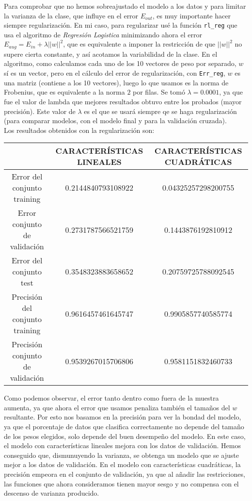 \documentclass{article}
\begin{document}
Para comprobar que no hemos sobreajustado el modelo a los datos y para limitar la varianza de la clase, que influye en el error $E_{out}$, es muy importante hacer siempre regularización. En mi caso, para regularizar usé la función \texttt{rl\_reg} que usa el algoritmo de \textit{Regresión Logistica} minimizando ahora el error $E_{aug} = E_{in} + \lambda ||w||^2$, que es equivalente a imponer la restricción de que $||w||^2$ no supere cierta constante, y así acotamos la variabilidad de la clase. En el algoritmo, como calculamos cada uno de los 10 vectores de peso por separado, $w$ sí es un vector, pero en el cálculo del error de regularización, con \texttt{Err\_reg}, $w$ es una matriz (contiene a los 10 vectores), luego lo que usamos es la norma de Frobenius, que es equivalente a la norma $2$ por filas. Se tomó $\lambda = 0.0001$, ya que fue el valor de lambda que mejores resultados obtuvo entre los probados (mayor precisión). Este valor de $\lambda$ es el que se usará siempre qe se haga regularización (para comparar modelos, con el modelo final y para la validación cruzada).\\

Los resultados obtenidos con la regularización son:

\begin{center}
\begin{tabular}{|c|c|c|}
\hline
\multicolumn{1}{|c|}{}& \textbf{CARACTERÍSTICAS LINEALES} &
\textbf{CARACTERÍSTICAS CUADRÁTICAS}  \\ \hline
  Error del conjunto training       & 0.2144840793108922 & 0.04325257298200755 \\
  Error conjunto de validación      & 0.2731787566521759  & 0.1443876192810912 \\
  Error del conjunto test           & 0.3548323883658652  & 0.20759725788092545 \\
  Precisión del conjunto training   & 0.9616457461645747  & 0.9905857740585774 \\
  Precisión conjunto de validación  & 0.9539267015706806  & 0.9581151832460733 \\ \hline
\end{tabular}
\end{center}

Como podemos observar, el error tanto dentro como fuera de la muestra aumenta, ya que ahora el error que usamos penaliza también el tamaños del $w$ resultante. Por esto nos basamos en la precisión para ver la bondad del modelo, ya que el porcentaje de datos que clasifica correctamente no depende del tamaño de los pesos elegidos, solo depende del buen desempeño del modelo. En este caso, el modelo con características lineales mejora con los datos de validación. Hemos conseguido que, dismunuyendo la varianza, se obtenga un modelo que se ajuste mejor a los datos de validación. En el modelo con características cuadráticas, la precisión empeora en el conjunto de validación, ya que al añadir las restricciones, las funciones que ahora consideramos tienen mayor sesgo y no compensa con el descenso de varianza producido.\\
\end{document}
